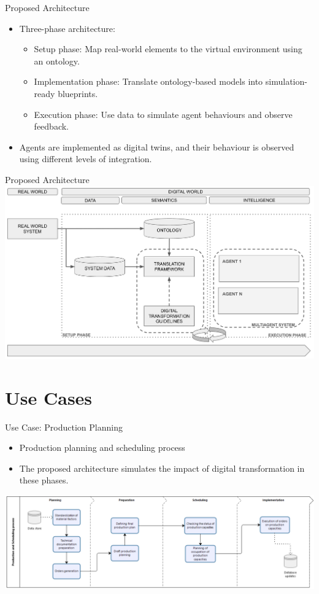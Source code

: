 \begin{frame}{Proposed Architecture}
    \begin{itemize}
        \item Three-phase architecture:
        \begin{itemize}
            \item \alert{Setup phase}: Map real-world elements to the virtual environment using an ontology.
            \item \alert{Implementation phase}: Translate ontology-based models into simulation-ready blueprints.
            \item \alert{Execution phase}: Use data to simulate agent behaviours and observe feedback.
        \end{itemize}
        \item Agents are implemented as digital twins, and their behaviour is observed using different levels of integration.
    \end{itemize}
\end{frame}

\begin{frame}{Proposed Architecture}
    \centering
    \includegraphics[width=0.8\linewidth]{Documents/240918 CECIIS @ UNIZG FOI/Figures/CECIIS-DT-ARCHITECTURE-II.png}
\end{frame}

\section{Use Cases}

\begin{frame}{Use Case: Production Planning}
    \begin{itemize}
        \item Production planning and scheduling process
        \item The proposed architecture simulates the impact of digital transformation in these phases.
    \end{itemize}

    \centering
    \includegraphics[width=0.9\linewidth]{Documents/240918 CECIIS @ UNIZG FOI/Figures/CECIIS-USE-CASE-PHASES.png}
\end{frame}

